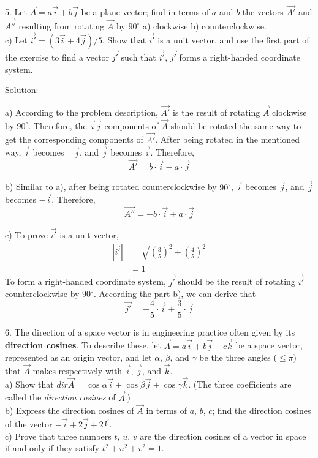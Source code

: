 \documentclass{article}
\begin{document}
5. Let $\vec{A} = a \vec{i} + b \vec{j}$ be a plane vector; find in terms of
$a$ and $b$ the vectors $\vec{A'}$ and $\vec{A''}$ resulting from rotating
$\vec{A}$ by $90^{\circ}$ \hspace{10px} a) clockwise \hspace{10px} b)
counterclockwise.\\
c) Let $\vec{i'} = (3 \vec{i} + 4 \vec{j}) / 5$. Show that $\vec{i'}$ is a unit
vector, and use the first part of the exercise to find a vector $\vec{j'}$ such
that $\vec{i'}$, $\vec{j'}$ forms a right-handed coordinate system.

Solution:

a) According to the problem description, $\vec{A'}$ is the result of rotating
$\vec{A}$ clockwise by $90^{\circ}$. Therefore, the $\vec{i} \vec{j}$-components
of $\vec{A}$ should be rotated the same way to get the corresponding components
of $\vec{A'}$. After being rotated in the mentioned way, $\vec{i}$ becomes
$-\vec{j}$, and $\vec{j}$ becomes $\vec{i}$. Therefore,
\[
  \vec{A'} = b \cdot \vec{i} - a \cdot \vec{j}
\]

b) Similar to a), after being rotated counterclockwise by $90^{\circ}$,
$\vec{i}$ becomes $\vec{j}$, and $\vec{j}$ becomes $-\vec{i}$. Therefore,
\[
  \vec{A''} = -b \cdot \vec{i} + a \cdot \vec{j}
\]

c) To prove $\vec{i'}$ is a unit vector,
\[
  \begin{split}
    |\vec{i'}| &= \sqrt{(\frac{3}{5})^2 + (\frac{4}{5})^2} \\
               &= 1
  \end{split}
\]
To form a right-handed coordinate system, $\vec{j'}$ should be the result of
rotating $\vec{i'}$ counterclockwise by $90^{\circ}$. According the part b),
we can derive that
\[
  \vec{j'} = -\frac{4}{5} \cdot \vec{i} + \frac{3}{5} \cdot \vec{j}
\]

6. The direction of a space vector is in engineering practice often given by
its \textbf{direction cosines}. To describe these, let 
$\vec{A} = a \vec{i} + b \vec{j} + c \vec{k}$ be a space vector, represented as 
an origin vector, and let $\alpha$, $\beta$, and $\gamma$ be the three angles 
($\le \pi$) that $\vec{A}$ makes respectively with $\vec{i}$, $\vec{j}$, and 
$\vec{k}$.\\
a) Show that $dir \vec{A} = \cos\alpha \vec{i} + \cos\beta \vec{j} +
\cos\gamma \vec{k}$. (The three coefficients are called the \emph{direction
cosines} of $\vec{A}$.)\\
b) Express the direction cosines of $\vec{A}$ in terms of $a$, $b$, $c$; find
the direction cosines of the vector $-\vec{i} + 2\vec{j} + 2\vec{k}$.\\
c) Prove that three numbers $t$, $u$, $v$ are the direction cosines of a vector
in space if and only if they satisfy $t^{2} + u^{2} + v^{2} = 1$.
\end{document}
